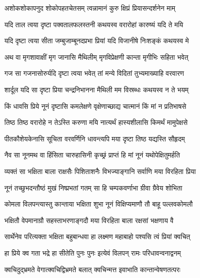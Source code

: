 \twolineshloka
{अशोकशोकापनुद शोकोपहतचेतसम्}
{त्वन्नामानं कुरु क्षिप्रं प्रियासन्दर्शनेन माम्} %

\twolineshloka
{यदि ताल त्वया दृष्टा पक्वतालफलस्तनी}
{कथयस्व वरारोहां कारुष्यं यदि ते मयि} %

\twolineshloka
{यदि दृष्टा त्वया सीता जम्बुजाम्बूनदप्रभा}
{प्रियां यदि विजानीषे निःशङ्कं कथयस्व मे} %

\twolineshloka
{अथ वा मृगशावाक्षीं मृग जानासि मैथिलीम्}
{मृगविप्रेक्षणी कान्ता मृगीभिः सहिता भवेत्} %

\twolineshloka
{गज सा गजनासोरुर्यदि दृष्टा त्वया भवेत्}
{तां मन्ये विदितां तुभ्यमाख्याहि वरवारण} %

\twolineshloka
{शार्दूल यदि सा दृष्टा प्रिया चन्द्रनिभानना}
{मैथिली मम विस्रब्धः कथयस्व न ते भयम्} %

\twolineshloka
{किं धावसि प्रिये नूनं दृष्टासि कमलेक्षणे}
{वृक्षेणाच्छाद्य चात्मानं किं मां न प्रतिभाषसे} %

\twolineshloka
{तिष्ठ तिष्ठ वरारोहे न तेऽस्ति करुणा मयि}
{नात्यर्थं हास्यशीलासि किमर्थं मामुपेक्षसे} %

\twolineshloka
{पीतकौशेयकेनासि सूचिता वरवर्णिनि}
{धावन्त्यपि मया दृष्टा तिष्ठ यद्यस्ति सौहृदम्} %

\twolineshloka
{नैव सा नूनमथ वा हिंसिता चारुहासिनी}
{कृच्छ्रं प्राप्तं हि मां नूनं यथोपेक्षितुमर्हति} %

\twolineshloka
{व्यक्तं सा भक्षिता बाला राक्षसैः पिशिताशनैः}
{विभज्याङ्गानि सर्वाणि मया विरहिता प्रिया} %

\twolineshloka
{नूनं तच्छुभदन्तौष्ठं मुखं निष्प्रभतां गतम्}
{सा हि चम्पकवर्णाभा ग्रीवा ग्रैवेय शोभिता} %

\twolineshloka
{कोमला विलपन्त्यास्तु कान्ताया भक्षिता शुभा}
{नूनं विक्षिप्यमाणौ तौ बाहू पल्लवकोमलौ} %

\twolineshloka
{भक्षितौ वेपमानाग्रौ सहस्ताभरणाङ्गदौ}
{मया विरहिता बाला रक्षसां भक्षणाय वै} %

\twolineshloka
{सार्थेनेव परित्यक्ता भक्षिता बहुबान्धवा}
{हा लक्ष्मण महाबाहो पश्यसि त्वं प्रियां क्वचित्} %

\twolineshloka
{हा प्रिये क्व गता भद्रे हा सीतेति पुनः पुनः}
{इत्येवं विलपन् रामः परिधावन्वनाद्वनम्} %

\twolineshloka
{क्वचिदुद्भ्रमते वेगात्क्वचिद्विभ्रमते बलात्}
{क्वचिन्मत्त इवाभाति कान्तान्वेषणतत्परः} %

